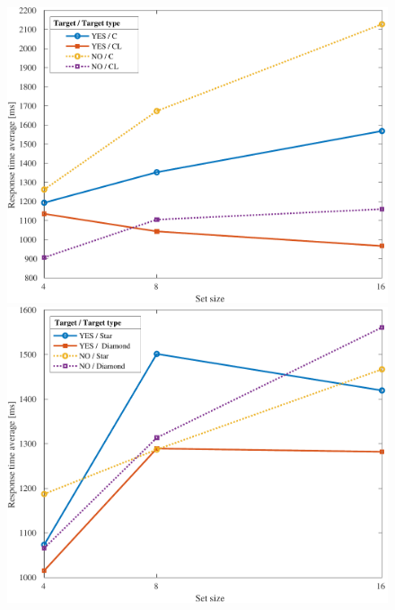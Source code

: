 \begin{figure}
    \centering
    \begin{minipage}{.34\textwidth}
        \centering
        \includegraphics[keepaspectratio,width=\textwidth]{../../Figures/13_01_graph.pdf}
    \end{minipage}
    \begin{minipage}{.34\textwidth}
        \centering
        \includegraphics[keepaspectratio,width=\textwidth]{../../Figures/13_02_graph.pdf}
    \end{minipage}
    \begin{minipage}{.34\textwidth}
        \centering

\end{minipage}
\end{figure}
